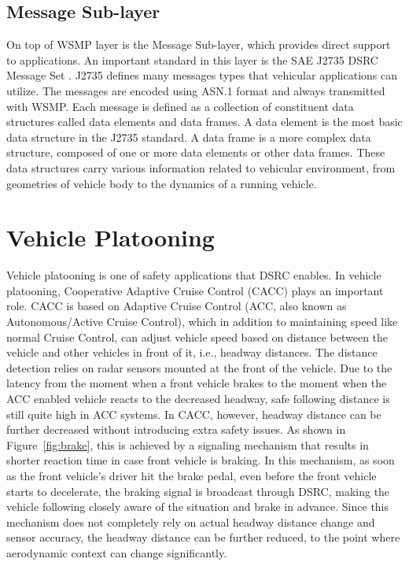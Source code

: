 \documentclass[12pt]{report}
\begin{document}
\subsection{Message Sub-layer}
On top of WSMP layer is the Message Sub-layer, which provides direct support to applications. An important standard in this layer is the SAE J2735 DSRC Message Set \cite{sae2016j2735}. J2735 defines many messages types that vehicular applications can utilize. The messages are encoded using ASN.1 format and always transmitted with WSMP. Each message is defined as a collection of constituent data structures called data elements and data frames. A data element is the most basic data structure in the J2735 standard. A data frame is a more complex data structure, composed of one or more data elements or other data frames. \cite{kenney2011} These data structures carry various information related to vehicular environment, from geometries of vehicle body to the dynamics of a running vehicle.

\section{Vehicle Platooning}
Vehicle platooning is one of safety applications that DSRC enables. In vehicle platooning, Cooperative Adaptive Cruise Control (CACC) plays an important role. CACC is based on Adaptive Cruise Control (ACC, also known as Autonomous/Active Cruise Control), which in addition to maintaining speed like normal Cruise Control, can adjust vehicle speed based on distance between the vehicle and other vehicles in front of it, i.e., headway distances. The distance detection relies on radar sensors mounted at the front of the vehicle. Due to the latency from the moment when a front vehicle brakes to the moment when the ACC enabled vehicle reacts to the decreased headway, safe following distance is still quite high in ACC systems. In CACC, however, headway distance can be further decreased without introducing extra safety issues. As shown in Figure~\ref{fig:brake}, this is achieved by a signaling mechanism that results in shorter reaction time in case front vehicle is braking. In this mechanism, as soon as the front vehicle's driver hit the brake pedal, even before the front vehicle starts to decelerate, the braking signal is broadcast through DSRC, making the vehicle following closely aware of the situation and brake in advance. Since this mechanism does not completely rely on actual headway distance change and sensor accuracy, the headway distance can be further reduced, to the point where aerodynamic context can change significantly.
\end{document}
